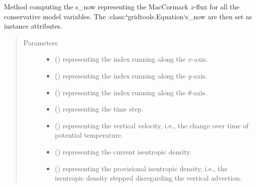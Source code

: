 \documentclass[letterpaper,10pt,english]{sphinxmanual}
\begin{document}
\begin{fulllineitems}
\begin{fulllineitems}
\label{\detokenize{api:dycore.flux_isentropic_maccormack.FluxIsentropicMacCormack._compute_vertical_fluxes}}
Method computing the s\_now representing the MacCormack \(z\)-flux for all the conservative
model variables. The :class:{\color{red}\bfseries{}{}`}gridtools.Equation{}`s\_now are then set as instance attributes.
\begin{quote}\begin{description}
\item[{Parameters}] \leavevmode\begin{itemize}
\item {} 
 () \textendash{}  representing the index running along the \(x\)-axis.

\item {} 
 () \textendash{}  representing the index running along the \(y\)-axis.

\item {} 
 () \textendash{}  representing the index running along the \(\theta\)-axis.

\item {} 
 () \textendash{}  representing the time step.

\item {} 
 () \textendash{}  representing the vertical velocity, i.e., the change over time of potential temperature.

\item {} 
 () \textendash{}  representing the current isentropic density.

\item {} 
 () \textendash{}  representing the provisional isentropic density, i.e., the isentropic density stepped
disregarding the vertical advection.


\end{itemize}
\end{description}
\end{quote}
\end{fulllineitems}
\end{fulllineitems}
\end{document}
